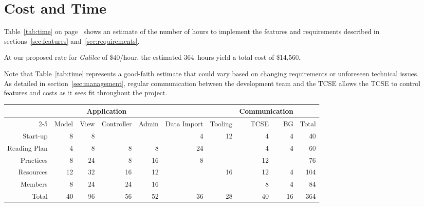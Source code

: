 \documentclass{article}
\newcommand{\gal}{\emph{Galilee}}
\newcommand{\tcse}{TCSE}
\begin{document}
\section{Cost and Time}
\label{sec:cost-time}

Table~\ref{tab:time} on page~\pageref{tab:time} shows
an estimate of the number of hours to implement
the features and requirements described in
sections~\ref{sec:features} and~\ref{sec:requirements}.

At our proposed rate for \gal{} of \$40/hour,
the estimated 364~hours yield a
total cost of \$14,560.

Note that Table~\ref{tab:time}
represents a good-faith estimate
that could vary
based on changing requirements
or unforeseen technical issues.
As detailed in section~\ref{sec:management},
regular communication
between the development team and the \tcse{}
allows the \tcse{} to control features and costs
as it sees fit throughout the project.

\begin{sidewaystable}
  \centering
  \begin{tabular}{rrrrrrrrrr}
    \toprule
                 & \multicolumn{4}{c}{Application} & & & \multicolumn{2}{c}{Communication} & \\
    \cmidrule{2-5}
    \cmidrule{8-9}
                 & Model & View & Controller & Admin & Data Import & Tooling & TCSE & BG & Total \\
    Start-up     & 8     & 8    &            &       & 4           & 12      & 4    & 4  & 40    \\
    Reading Plan & 4     & 8    & 8          & 8     & 24          &         & 4    & 4  & 60    \\
    Practices    & 8     & 24   & 8          & 16    & 8           &         & 12   &    & 76    \\
    Resources    & 12    & 32   & 16         & 12    &             & 16      & 12   & 4  & 104   \\
    Members      & 8     & 24   & 24         & 16    &             &         & 8    & 4  & 84    \\
    \addlinespace
    Total        & 40    & 96   & 56         & 52    & 36          & 28      & 40   & 16 & 364   \\
    \bottomrule
  \end{tabular}
  \caption{Time estimate for \gal{} (hours)}
  \label{tab:time}
\end{sidewaystable}

\appendix
\end{document}
